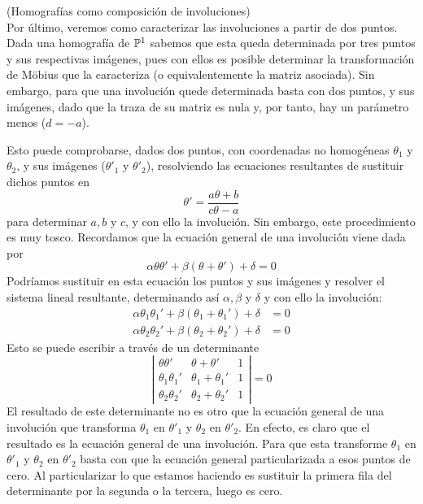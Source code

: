 (Homografías como composición de involuciones)\\

Por último, veremos como caracterizar las involuciones a partir de dos puntos.\\

Dada una homografía de $\mathbb{P}^1$ sabemos que esta queda determinada por tres puntos y sus respectivas imágenes, pues con ellos es posible determinar la transformación de Möbius que la caracteriza (o equivalentemente la matriz asociada). Sin embargo, para que una involución quede determinada basta con dos puntos, y sus imágenes, dado que la traza de su matriz es nula y, por tanto, hay un parámetro menos ($d=-a$).

Esto puede comprobarse, dados dos puntos, con coordenadas no homogéneas $\theta_1$ y $\theta_2$, y sus imágenes ($\theta'_1$ y $\theta'_2$), resolviendo las ecuaciones resultantes de sustituir dichos puntos en 
\begin{equation}
	\label{C6:eq_moebius_haces_ec2}
	\theta'=\frac{a\theta+b}{c\theta -a}
\end{equation}
para determinar $a,b$ y $c$, y con ello la involución. Sin embargo, este procedimiento es muy tosco. Recordamos que la ecuación general de una involución viene dada por 
\begin{equation*}
	\alpha\theta\theta'+\beta(\theta+\theta')+\delta=0
\end{equation*}
Podríamos sustituir en esta ecuación los puntos y sus imágenes y resolver el sistema lineal resultante, determinando así $\alpha,\beta$ y $\delta$ y con ello la involución:
\begin{equation*}
	\begin{split}
		\alpha\theta_1\theta_1'+\beta(\theta_1+\theta_1')+\delta&=0\\
		\alpha\theta_2\theta_2'+\beta(\theta_2+\theta_2')+\delta&=0
	\end{split}
\end{equation*}
Esto se puede escribir a través de un determinante
\begin{equation}
	\left| \begin{array}{ccc}
		\theta\theta'&\theta+\theta'&1\\
		\theta_1\theta_1'&\theta_1+\theta_1'&1\\
		\theta_2\theta_2'&\theta_2+\theta_2'&1
	\end{array}\right| =0
\end{equation}
El resultado de este determinante no es otro que la ecuación general de una involución que transforma $\theta_1$ en $\theta'_1$ y $\theta_2$ en $\theta'_2$. En efecto, es claro que el resultado es la ecuación general de una involución. Para que esta transforme $\theta_1$ en $\theta'_1$ y $\theta_2$ en $\theta'_2$ basta con que la ecuación general particularizada a esos puntos de cero. Al particularizar lo que estamos haciendo es sustituir la primera fila del determinante por la segunda o la tercera, luego es cero.

